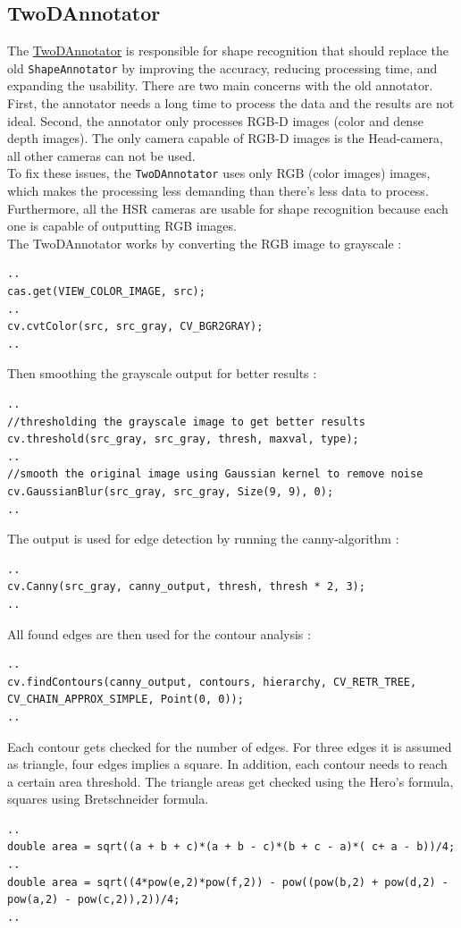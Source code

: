 \documentclass[main.tex]{subfiles}
\begin{document}
                \subsection{TwoDAnnotator}
The \href{https://github.com/SUTURO/suturo_perception/blob/Handcamera_tracking/rs_Athene/src/TwoDAnnotator.cpp}{TwoDAnnotator} is responsible for shape recognition that should replace the old \texttt{ShapeAnnotator} by improving the accuracy, reducing processing time, and expanding the usability. 
There are two main concerns with the old annotator. First, the annotator needs a long time to process the data and the results are not ideal. Second, the annotator only processes RGB-D images (color and dense depth images). The only camera capable of RGB-D images is the Head-camera, all other cameras can not be used. \\
To fix these issues, the \texttt{TwoDAnnotator} uses only RGB (color images) images, which makes the processing less demanding than there's less data to process. Furthermore, all the HSR cameras are usable for shape recognition because each one is capable of outputting RGB images. \\
The TwoDAnnotator works by converting the RGB image to grayscale :
\begin{lstlisting}
..
cas.get(VIEW_COLOR_IMAGE, src); 
..
cv.cvtColor(src, src_gray, CV_BGR2GRAY);
..
\end{lstlisting}
Then smoothing the grayscale output for better results : 
\begin{lstlisting}
..
//thresholding the grayscale image to get better results
cv.threshold(src_gray, src_gray, thresh, maxval, type);
..
//smooth the original image using Gaussian kernel to remove noise
cv.GaussianBlur(src_gray, src_gray, Size(9, 9), 0);
..
\end{lstlisting}
The output is used for edge detection by running the canny-algorithm : 
\begin{lstlisting}
..
cv.Canny(src_gray, canny_output, thresh, thresh * 2, 3);
..
\end{lstlisting}
All found edges are then used for the contour analysis : 
\begin{lstlisting}
..
cv.findContours(canny_output, contours, hierarchy, CV_RETR_TREE, CV_CHAIN_APPROX_SIMPLE, Point(0, 0));
..
\end{lstlisting}
Each contour gets checked for the number of edges. For three edges it is assumed as triangle, four edges implies a square. In addition, each contour needs to reach a certain area threshold. The triangle areas get checked using the Hero's formula, squares using Bretschneider formula. \\
\begin{lstlisting}
..
double area = sqrt((a + b + c)*(a + b - c)*(b + c - a)*( c+ a - b))/4;
..
double area = sqrt((4*pow(e,2)*pow(f,2)) - pow((pow(b,2) + pow(d,2) - pow(a,2) - pow(c,2)),2))/4;
..
\end{lstlisting}
\end{document}
